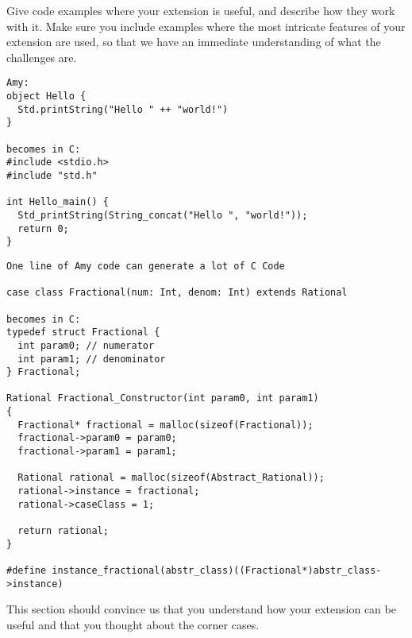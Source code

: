 Give code examples where your extension is useful, and describe how they work
with it. Make sure you include examples where the most intricate features of
your extension are used, so that we have an immediate understanding of what the
challenges are.

%

\begin{lstlisting}
Amy:
object Hello {
  Std.printString("Hello " ++ "world!")
}

becomes in C:
#include <stdio.h>
#include "std.h"

int Hello_main() {
  Std_printString(String_concat("Hello ", "world!"));
  return 0;
}
\end{lstlisting}

\begin{lstlisting}
One line of Amy code can generate a lot of C Code

case class Fractional(num: Int, denom: Int) extends Rational

becomes in C:
typedef struct Fractional {
  int param0; // numerator
  int param1; // denominator
} Fractional;

Rational Fractional_Constructor(int param0, int param1) 
{
  Fractional* fractional = malloc(sizeof(Fractional));
  fractional->param0 = param0;
  fractional->param1 = param1;

  Rational rational = malloc(sizeof(Abstract_Rational));
  rational->instance = fractional;
  rational->caseClass = 1;

  return rational;
}

#define instance_fractional(abstr_class)((Fractional*)abstr_class->instance)

\end{lstlisting}
This section should convince us that you understand how your extension can be
useful and that you thought about the corner cases.

